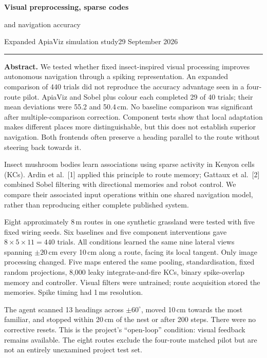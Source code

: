 \documentclass[10pt,a4paper]{article}
\newcommand{\topic}[1]{\vspace{4pt}{\large\bfseries #1}\par}
\begin{document}
{\LARGE\bfseries Visual preprocessing, sparse codes\par
and navigation accuracy\par}
\vspace{3pt}
{\small Expanded ApiaViz simulation study\hfill 29 September 2026}
\vspace{5pt}\hrule\vspace{4pt}

{\small\textbf{Abstract.} We tested whether fixed insect-inspired visual
processing improves autonomous navigation through a spiking representation.
An expanded comparison of 440 trials did not reproduce the accuracy advantage
seen in a four-route pilot. ApiaViz and Sobel plus colour each completed 29 of
40 trials; their mean deviations were 55.2 and 50.4\,cm. No baseline comparison
was significant after multiple-comparison correction. Component tests show
that local adaptation makes different places more distinguishable, but this
does not establish superior navigation. Both frontends often preserve a heading
parallel to the route without steering back towards it.\par}

\topic{1\quad Matched learning and navigation}
Insect mushroom bodies learn associations using sparse activity in Kenyon
cells (KCs). Ardin et al.~[1] applied this principle to route memory;
Gattaux et al.~[2] combined Sobel filtering with directional memories and
robot control. We compare their associated input operations within one shared
navigation model, rather than reproducing either complete published system.

Eight approximately 8\,m routes in one synthetic grassland were tested with
five fixed wiring seeds. Six baselines and five component interventions gave
$8\times5\times11=440$ trials. All conditions learned the same nine lateral
views spanning $\pm20$\,cm every 10\,cm along a route, facing its local tangent.
Only image processing changed. Five maps entered the same pooling,
standardisation, fixed random projections, 8,000 leaky integrate-and-fire KCs,
binary spike-overlap memory and controller. Visual filters were untrained;
route acquisition stored the memories. Spike timing had 1\,ms resolution.

The agent scanned 13 headings across $\pm60^\circ$, moved 10\,cm towards the
most familiar, and stopped within 20\,cm of the nest or after 200 steps.
There were no corrective resets. This is the project's ``open-loop'' condition:
visual feedback remains available. The eight routes exclude the four-route
matched pilot but are not an entirely unexamined project test set.
\end{document}
